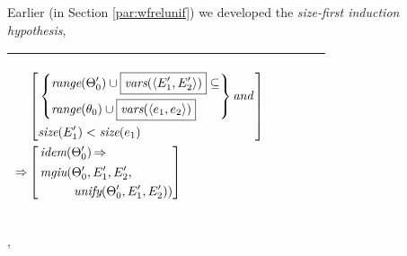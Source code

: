 \documentclass[runningheads]{llncs}
\DeclareMathOperator{\uand}{\emph{and}\,}
\DeclareMathOperator{\uimplies}{\Rightarrow}
\DeclareMathOperator{\unify}{\emph{unify}}
\DeclareMathOperator{\idem}{\emph{idem}}
\DeclareMathOperator{\mgiu}{\emph{mgiu}}
\begin{document}
\vspace{10pt}Earlier (in Section \ref{par:wfrelunif}) we developed the \emph{size-first induction hypothesis},
  \begin{center}
  \begin{tabular}{|m{}|m{}||m{}|}
\hline
\begin{center}
{$\begin{aligned}
 &\begin{aligned}
&\begin{aligned}
&\left[\begin{aligned}
 &\left\{\begin{aligned}
 &\range(\Thet{0}')\cup\boxed{\vars(\langle \E{1}', \E{2}' \rangle)} \subseteq \\
  &\range(\thet{0})\cup\boxed{\vars(\langle \e{1}, \e{2} \rangle)} 
  \end{aligned}\right\} \uand  \\
  &\size(\E{1}') < \size(\e{1})
  \end{aligned} \right] 
  \end{aligned} 
\end{aligned} \\
 \uimplies &\left[\begin{aligned}&\idem(\Thet{0}') \uimplies \\
 &\begin{aligned}
    {\,\mgiu}(&\Thet{0}', \E{1}', \E{2}', \\
    &\unify(\Thet{0}', \E{1}', \E{2}')) 
\end{aligned}
\end{aligned}\right] \end{aligned}  $}  \hspace{1cm} 
\end{center}& &  \\  \hline
\end{tabular},
\end{center}
\end{document}
